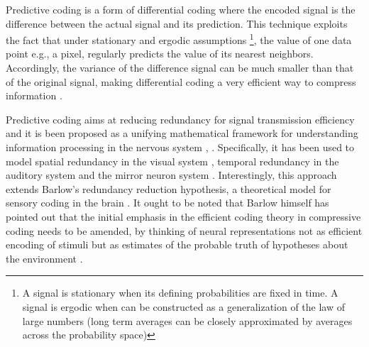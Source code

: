 \documentclass[11pt,twocolumn]{article}
\begin{document}
Predictive coding is a form of differential coding where the encoded signal is the difference between the actual signal and its prediction. This technique exploits the fact that under stationary and ergodic assumptions \footnote{A signal is stationary when its defining probabilities are fixed in time. A signal is ergodic when can be constructed as a generalization of the law of large numbers (long term averages can be closely approximated by averages across the probability space)}, the value of one data point e.g., a pixel, regularly predicts the value of its nearest neighbors. Accordingly, the variance of the difference signal can be much smaller than that of the original signal, making differential coding a very efficient way to compress information \citep{shi_image_1999}.

Predictive coding aims at reducing redundancy for signal transmission efficiency and it is been proposed as a unifying mathematical framework for understanding information processing in the nervous system \citep{Friston:2010}, \citep{huang_predictive_2011}. Specifically, it has been used to model spatial redundancy in the visual system \citep{srinivasan_predictive_1982}, temporal redundancy in the auditory system \citep{baldeweg_repetition_2006} and the mirror neuron system \citep{kilner_predictive_2007}. Interestingly, this approach extends Barlow's redundancy reduction hypothesis, a theoretical model for sensory coding in the brain \citep{Barlow:1972}. It ought to be noted that Barlow himself has pointed out that the initial emphasis in the efficient coding theory in compressive coding %
needs to be amended, by thinking of neural representations not as efficient encoding of stimuli but as estimates of the probable truth of hypotheses about the environment \citep{barlow_redundancy_2001}. 
\end{document}
